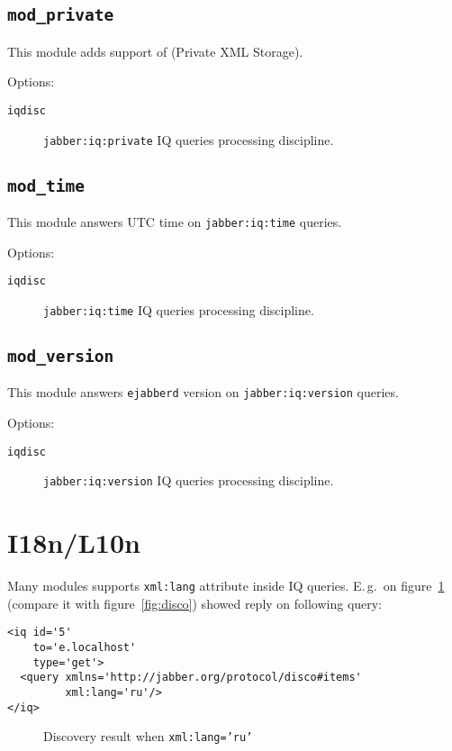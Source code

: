 \documentclass[10pt]{article}
\newcommand{\imgscale}{0.58}
\newcommand{\insimg}[1]{\insscaleimg{\imgscale}{#1}}
\newcommand{\insscaleimg}[2]{
  \imgsrc{#2}{}
  \begin{latexonly}
    \scalebox{#1}{\texttt{[image: \#2]}}
  \end{latexonly}
}
\newcommand{\ns}[1]{\texttt{#1}}
\newcommand{\ejabberd}{\texttt{ejabberd}}
\newcommand{\modprivate}{\texttt{mod\_private}}
\newcommand{\modtime}{\texttt{mod\_time}}
\newcommand{\modversion}{\texttt{mod\_version}}
\begin{document}
\subsection{\modprivate{}}
\label{sec:modprivate}

This module adds support of
 (Private XML
Storage).

Options:
\begin{description}
\item[\texttt{iqdisc}] \ns{jabber:iq:private} IQ queries processing discipline.
\end{description}

\subsection{\modtime{}}
\label{sec:modtime}

This module answers UTC time on \ns{jabber:iq:time} queries.

Options:
\begin{description}
\item[\texttt{iqdisc}] \ns{jabber:iq:time} IQ queries processing discipline.
\end{description}


\subsection{\modversion{}}
\label{sec:modversion}

This module answers \ejabberd{} version on \ns{jabber:iq:version} queries.

Options:
\begin{description}
\item[\texttt{iqdisc}] \ns{jabber:iq:version} IQ queries processing discipline.
\end{description}




\section{I18n/L10n}
\label{sec:i18nl10n}

Many modules supports \texttt{xml:lang} attribute inside IQ queries.  E.\,g.\ 
on figure~\ref{fig:discorus} (compare it with figure~\ref{fig:disco}) showed
reply on following query:
\begin{verbatim}
<iq id='5'
    to='e.localhost'
    type='get'>
  <query xmlns='http://jabber.org/protocol/disco#items'
         xml:lang='ru'/>
</iq>
\end{verbatim}

\begin{figure}[htbp]
  \centering
  \insimg{discorus.png}
  \caption{Discovery result when \texttt{xml:lang='ru'}}
  \label{fig:discorus}
\end{figure}
\end{document}
